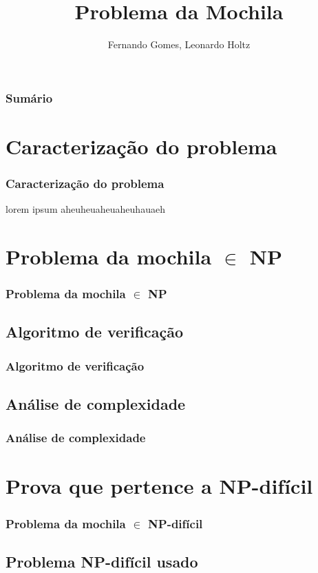 \documentclass{beamer}
\title{Problema da Mochila}
\author{Fernando Gomes, Leonardo Holtz}
\institute{Universidade Federal do Rio Grande do Sul}
\date{}
\begin{document}
\begin{frame}
\titlepage
\end{frame}

\begin{frame}
\frametitle{Sumário}
\tableofcontents
\end{frame}

\section{Caracterização do problema}
\begin{frame}
\frametitle{Caracterização do problema}
lorem ipsum aheuheuaheuaheuhauaeh
\end{frame}

\section{Problema da mochila $\in$ NP}
\begin{frame}
    \frametitle{Problema da mochila $\in$ NP}
\end{frame}

\subsection{Algoritmo de verificação}
\begin{frame}
\frametitle{Algoritmo de verificação}
\end{frame}

\subsection{Análise de complexidade}
\begin{frame}
\frametitle{Análise de complexidade}
\end{frame}


\section{Prova que pertence a NP-difícil}
\begin{frame}
\frametitle{Problema da mochila $\in$ NP-difícil}
\end{frame}

\subsection{Problema NP-difícil usado}
\begin{frame}
\frametitle{}
\end{frame}
\end{document}
